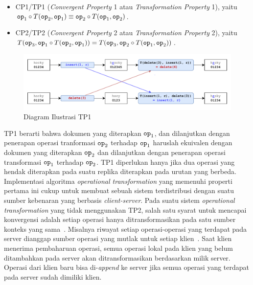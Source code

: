 \begin{itemize}
    \item CP1/TP1 (\textit{Convergent Property} 1 atau \textit{Transformation Property} 1), yaitu $\texttt{op}_1 \circ T(\texttt{op}_2, \texttt{op}_1) \equiv \texttt{op}_2 \circ T(\texttt{op}_1, \texttt{op}_2)$.
    \item CP2/TP2 (\textit{Convergent Property} 2 atau \textit{Transformation Property} 2), yaitu $T(\texttt{op}_{3},\texttt{op}_{1}\circ T(\texttt{op}_{2},\texttt{op}_{1}))=T(\texttt{op}_{3},\texttt{op}_{2}\circ T(\texttt{op}_{1},\texttt{op}_{2}))$.
\end{itemize}


\begin{figure}[h]
    \centering
    \includegraphics[scale=0.8]{assets/skripsi/OT}
    \caption{Diagram Ilustrasi TP1}
    \label{fig:OTschema}
\end{figure}

TP1 berarti bahwa dokumen yang diterapkan $\texttt{op}_1$, dan dilanjutkan dengan penerapan operasi tranformasi $\texttt{op}_2$ terhadap $\texttt{op}_1$ haruslah ekuivalen dengan dokumen yang diterapkan $\texttt{op}_2$ dan dilanjutkan dengan penerapan operasi transformasi $\texttt{op}_1$ terhadap $\texttt{op}_2$. TP1 diperlukan hanya jika dua operasi yang hendak diterapkan pada suatu replika diterapkan pada urutan yang berbeda. Implementasi algoritma \textit{operational transformation} yang memenuhi properti pertama ini cukup untuk membuat sebuah sistem terdistribusi dengan suatu sumber kebenaran yang berbasis \textit{client-server}. Pada suatu sistem \textit{operational transformation} yang tidak menggunakan TP2, salah satu syarat untuk mencapai konvergensi adalah setiap operasi hanya ditransformasikan pada satu sumber konteks yang sama~\citep{Xu2016}. Misalnya riwayat setiap operasi-operasi yang terdapat pada server dianggap sumber operasi yang mutlak untuk setiap klien~\citep{Vidot2000}. Saat klien menerima pembaharuan operasi, semua operasi lokal pada klien yang belum ditambahkan pada server akan ditransformasikan berdasarkan milik server. Operasi dari klien baru bisa di-\textit{append} ke server jika semua operasi yang terdapat pada server sudah dimiliki klien.

